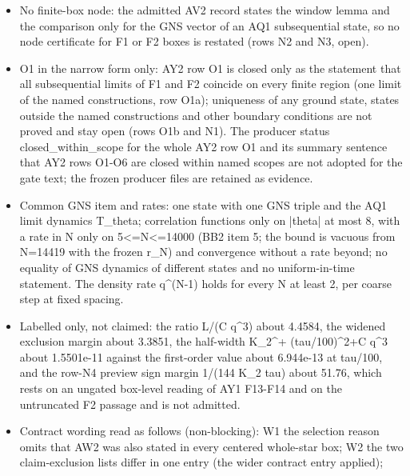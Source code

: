 \begin{gatequote}
\begin{itemize}
labelled re-evaluated values are not used); N=2 and N=3 are open (row N4)
because the widened interval contains 0 there; cutoff-L F2 states are not
claimed; the F1 boxes are as certified by AW2, recorded as agreement and not
re-derived. C\textquotesingle{} at the hypothesis values does not depend on
tau and AW2 admits the enclosure at the cap only, so nothing below the cap is
claimed.
\item No finite-box node: the admitted AV2 record states the window lemma and
the comparison only for the GNS vector of an AQ1 subsequential state, so no
node certificate for F1 or F2 boxes is restated (rows N2 and N3, open).
\item O1 in the narrow form only: AY2 row O1 is closed only as the statement
that all subsequential limits of F1 and F2 coincide on every finite region
(one limit of the named constructions, row O1a); uniqueness of any ground
state, states outside the named constructions and other boundary conditions
are not proved and stay open (rows O1b and N1). The producer status
closed\_within\_scope for the whole AY2 row O1 and its summary sentence that
AY2 rows O1-O6 are closed within named scopes are not adopted for the gate
text; the frozen producer files are retained as evidence.
\item Common GNS item and rates: one state with one GNS triple and the AQ1
limit dynamics T\_theta; correlation functions only on |theta| at most 8, with
a rate in N only on 5<=N<=14000 (BB2 item 5; the bound is vacuous from N=14419
with the frozen r\_N) and convergence without a rate beyond; no equality of
GNS dynamics of different states and no uniform-in-time statement. The density
rate q\textasciicircum{}(N-1) holds for every N at least 2, per coarse step at
fixed spacing.
\item Labelled only, not claimed: the ratio L/(C\textquotesingle{}
q\textasciicircum{}3) about 4.4584, the widened exclusion margin about 3.3851,
the half-width K\_2\textasciicircum{}+
(tau/100)\textasciicircum{}2+C\textquotesingle{} q\textasciicircum{}3 about
1.5501e-11 against the first-order value about 6.944e-13 at tau/100, and the
row-N4 preview sign margin 1/(144 K\_2\textquotesingle{} tau) about 51.76,
which rests on an ungated box-level reading of AY1 F13-F14 and on the
untruncated F2 passage and is not admitted.
\item Contract wording read as follows (non-blocking): W1 the selection reason
omits that AW2 was also stated in every centered whole-star box; W2 the two
claim-exclusion lists differ in one entry (the wider contract entry applied);

\end{itemize}
\end{gatequote}
